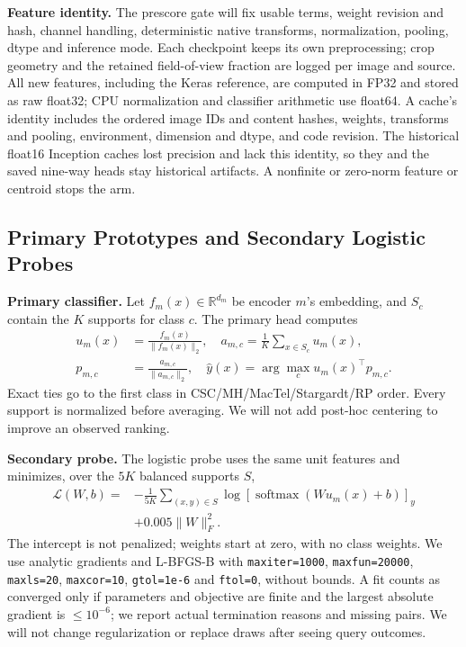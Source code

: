 \documentclass[conference]{IEEEtran}
\newcommand{\R}{\mathbb{R}}
\newcommand{\claim}[1]{} %
\begin{document}
\claim{C16}
\textbf{Feature identity.} The prescore gate will fix usable terms, weight revision and hash, channel handling, deterministic native transforms, normalization, pooling, dtype and inference mode. Each checkpoint keeps its own preprocessing; crop geometry and the retained field-of-view fraction are logged per image and source. All new features, including the Keras reference, are computed in FP32 and stored as raw float32; CPU normalization and classifier arithmetic use float64. A cache's identity includes the ordered image IDs and content hashes, weights, transforms and pooling, environment, dimension and dtype, and code revision. The historical float16 Inception caches lost precision and lack this identity, so they and the saved nine-way heads stay historical artifacts. A nonfinite or zero-norm feature or centroid stops the arm.

\subsection{Primary Prototypes and Secondary Logistic Probes}
\claim{C17}
\textbf{Primary classifier.} Let $f_m(x)\in\R^{d_m}$ be encoder $m$'s embedding, and $S_c$ contain the $K$ supports for class $c$. The primary head computes
\begin{align}
u_m(x)&=\frac{f_m(x)}{\|f_m(x)\|_2},\quad
a_{m,c}=\frac{1}{K}\sum_{x\in S_c}u_m(x),\\
p_{m,c}&=\frac{a_{m,c}}{\|a_{m,c}\|_2},\quad
\widehat y(x)=\arg\max_c u_m(x)^\top p_{m,c}.
\label{eq:proto}
\end{align}
Exact ties go to the first class in CSC/MH/MacTel/Stargardt/RP order. Every support is normalized before averaging. We will not add post-hoc centering to improve an observed ranking.

\claim{C18}
\textbf{Secondary probe.} The logistic probe uses the same unit features and minimizes, over the $5K$ balanced supports $S$,
\begin{equation}
\begin{aligned}
\mathcal{L}(W,b)={}&-\frac{1}{5K}\sum_{(x,y)\in S}
\log\!\left[\operatorname{softmax}(Wu_m(x)+b)\right]_y\\
&+0.005\|W\|_F^2.
\end{aligned}
\label{eq:logistic}
\end{equation}
The intercept is not penalized; weights start at zero, with no class weights. We use analytic gradients and L-BFGS-B with \texttt{maxiter=1000}, \texttt{maxfun=20000}, \texttt{maxls=20}, \texttt{maxcor=10}, \texttt{gtol=1e-6} and \texttt{ftol=0}, without bounds. A fit counts as converged only if parameters and objective are finite and the largest absolute gradient is $\leq10^{-6}$; we report actual termination reasons and missing pairs. We will not change regularization or replace draws after seeing query outcomes.
\end{document}
